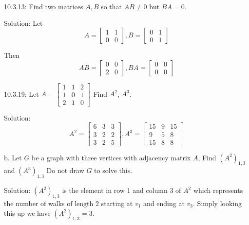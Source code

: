 \documentclass[16 pt]{amsart}
\theoremstyle{definition}
\theoremstyle{remark}
\numberwithin{equation}{subsection}
\begin{document}
\newpage

10.3.13: Find two matrices $A,B$ so that $AB\neq 0$ but $BA=0$.

\vspace{1in}

Solution:
Let
\[
A=\begin{bmatrix}
1 & 1 \\ 0 & 0
\end{bmatrix},
B = \begin{bmatrix}
0 & 1 \\ 0 & 1
\end{bmatrix}
\]

Then
\[
AB = \begin{bmatrix}
0 & 0 \\ 2 & 0
\end{bmatrix},
BA = \begin{bmatrix}
0 & 0 \\ 0 & 0
\end{bmatrix}
\]

\newpage

10.3.19: Let $ A= \begin{bmatrix}
1 & 1 & 2 \\ 1 & 0 & 1 \\ 2 & 1 & 0
\end{bmatrix}$ 
Find $A^2$, $A^3$.

\vspace{.5in}

Solution: 
\[
A^2 = \begin{bmatrix}
6 & 3 & 3 \\ 3 & 2 & 2 \\ 3 & 2 & 5
\end{bmatrix},
A^3 = \begin{bmatrix}
15 & 9 & 15 \\ 9 & 5 & 8 \\ 15 & 8 & 8
\end{bmatrix}
\]

\vspace{.5in}

b. Let $G$ be a graph with three vertices with adjacency matrix $A$, Find $(A^2)_{1,3}$ and $(A^3)_{1,3}$
Do not draw $G$ to solve this.

\vspace{.5in}

Solution: $(A^2)_{1,3}$ is the element in row 1 and column 3 of $A^2$ which represents the number of walks of length 2 starting at $v_1$ and ending at $v_3$.  Simply looking this up we have $(A^2)_{1,3}=3$.
\end{document}
